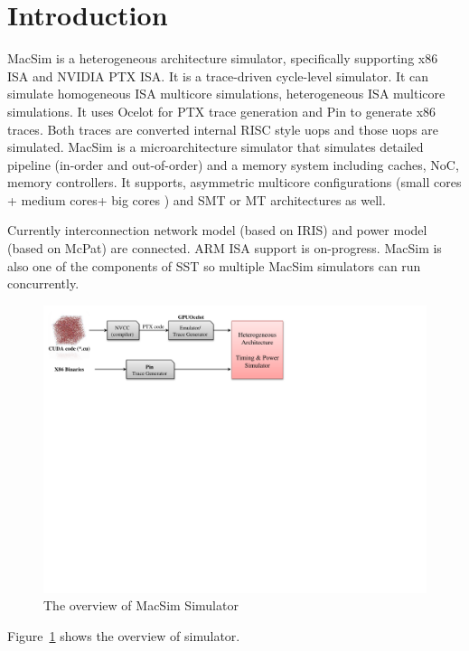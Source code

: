 
\section{Introduction}

MacSim is a heterogeneous architecture simulator, specifically supporting x86 ISA and NVIDIA PTX ISA. It is a trace-driven cycle-level simulator.  It can simulate homogeneous ISA multicore simulations, heterogeneous ISA multicore simulations. It uses Ocelot for PTX trace generation and Pin to generate x86 traces. Both traces are converted internal RISC style uops and those uops are simulated. MacSim is a microarchitecture simulator that simulates detailed pipeline (in-order and out-of-order) and a memory system including caches, NoC, memory controllers. It supports, asymmetric multicore configurations (small cores + medium cores+ big cores ) and SMT or MT architectures as well. 

Currently interconnection network model (based on IRIS) and power model (based on McPat) are connected. ARM ISA support is on-progress. MacSim is also one of the components of SST so multiple MacSim simulators can run concurrently. 

\begin{figure}[htb]
\centering
\includegraphics{figs/macsim_overview}
\caption{The overview of MacSim Simulator}
\label{fig:overview}
\end{figure}

Figure~\ref{fig:overview} shows the overview of \SIM simulator.


